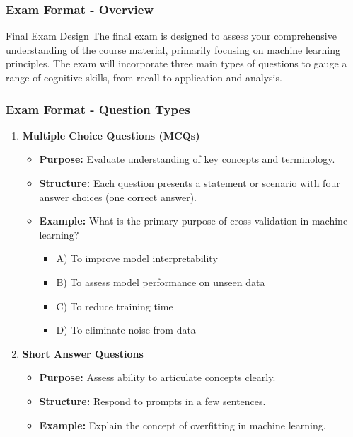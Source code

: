 \documentclass[aspectratio=169]{beamer}
\begin{document}
\begin{frame}[fragile]
    \frametitle{Exam Format - Overview}
    \begin{block}{Final Exam Design}
        The final exam is designed to assess your comprehensive understanding of the course material, primarily focusing on machine learning principles. The exam will incorporate three main types of questions to gauge a range of cognitive skills, from recall to application and analysis.
    \end{block}
\end{frame}

\begin{frame}[fragile]
    \frametitle{Exam Format - Question Types}
    \begin{enumerate}
        \item \textbf{Multiple Choice Questions (MCQs)}
            \begin{itemize}
                \item \textbf{Purpose:} Evaluate understanding of key concepts and terminology.
                \item \textbf{Structure:} Each question presents a statement or scenario with four answer choices (one correct answer).
                \item \textbf{Example:} What is the primary purpose of cross-validation in machine learning?
                \begin{itemize}
                    \item A) To improve model interpretability
                    \item B) To assess model performance on unseen data
                    \item C) To reduce training time
                    \item D) To eliminate noise from data
                \end{itemize}
            \end{itemize}
        
        \item \textbf{Short Answer Questions}
            \begin{itemize}
                \item \textbf{Purpose:} Assess ability to articulate concepts clearly.
                \item \textbf{Structure:} Respond to prompts in a few sentences.
                \item \textbf{Example:} Explain the concept of overfitting in machine learning.
            \end{itemize}
        

\end{enumerate}
\end{frame}
\end{document}
